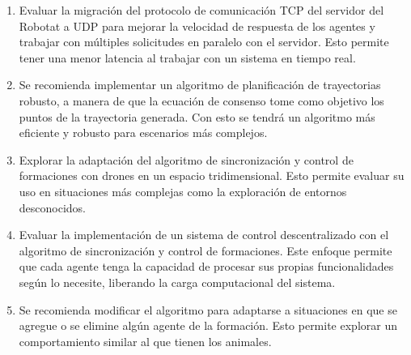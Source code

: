 \begin{enumerate}
	\item Evaluar la migración del protocolo de comunicación TCP del servidor del Robotat a UDP para mejorar la velocidad de respuesta de los agentes y trabajar con múltiples solicitudes en paralelo con el servidor. Esto permite tener una menor latencia al trabajar con un sistema en tiempo real.
	\item Se recomienda implementar un algoritmo de planificación de trayectorias robusto, a manera de que la ecuación de consenso tome como objetivo los puntos de la trayectoria generada. Con esto se tendrá un algoritmo más eficiente y robusto para escenarios más complejos.
	\item Explorar la adaptación del algoritmo de sincronización y control de formaciones con drones en un espacio tridimensional. Esto permite evaluar su uso en situaciones más complejas como la exploración de entornos desconocidos.
	\item Evaluar la implementación de un sistema de control descentralizado con el algoritmo de sincronización y control de formaciones. Este enfoque permite que cada agente tenga la capacidad de procesar sus propias funcionalidades según lo necesite, liberando la carga computacional del sistema.
	\item Se recomienda modificar el algoritmo para adaptarse a situaciones en que se agregue o se elimine algún agente de la formación. Esto permite explorar un comportamiento similar al que tienen los animales.
\end{enumerate}